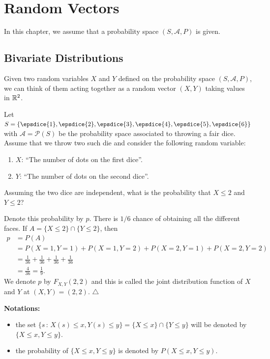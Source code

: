 
\chapter{Random Vectors}

In this chapter, we assume that a probability space $(S, \mathcal{A}, P)$ is given.

\section{Bivariate Distributions}
Given two random variables $X$ and $Y$ defined on the probability space $(S, \mathcal{A} , P )$, we can think of them acting together as a random vector $(X, Y)$ taking values in $\mathbb{R}^2$. 

\begin{example}
Let $S = \{ \epsdice{1} , \epsdice{2} , \epsdice{3} , \epsdice{4} , \epsdice{5} , \epsdice{6} \}$ with $\mathcal{A} = \mathcal{P} (S)$ be the probability space associated to throwing a fair dice. Assume that we throw two such die and consider the following random variable:
\begin{enumerate}[label=\arabic*)]
    \item $X$: ``The number of dots on the first dice''.
    \item $Y$: ``The number of dots on the second dice''.
\end{enumerate}
Assuming the two dice are independent, what is the probability that $X \leq 2$ and $Y \leq 2$?
\end{example}

\begin{sol*}
Denote this probability by $p$. There is $1/6$ chance of obtaining all the different faces. If $A = \{ X \leq 2 \} \cap \{ Y \leq 2 \}$, then
    \begin{align*}
        p &= P (A) \\ 
        &= P (X = 1, Y = 1) + P (X = 1, Y = 2) + P (X = 2, Y = 1) + P (X = 2, Y = 2) \\ 
        &= \frac{1}{36} + \frac{1}{36} + \frac{1}{36} + \frac{1}{36} \\ 
        &= \frac{4}{36} = \frac{1}{9} .
    \end{align*}
We denote $p$ by $F_{X, Y} (2, 2)$ and this is called the joint distribution function of $X$ and $Y$ at $ (X, Y) = (2, 2)$. \hfill $\triangle$
\end{sol*}

\textbf{Notations:}
    \begin{itemize}
        \item the set $\{ s \, : \, X (s) \leq x , Y (s) \leq y \} = \{ X \leq x \} \cap \{ Y \leq y \}$ will be denoted by $\{ X \leq x , Y \leq y \}$.
        \item the probability of $\{ X \leq x , Y \leq y \}$ is denoted by $P (X \leq x , Y \leq y )$. 
    \end{itemize}

